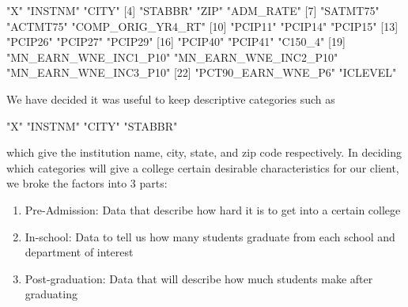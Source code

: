 \documentclass{article}
\begin{document}
\begin{Schunk}
\begin{Soutput}
 [1] "X"                    "INSTNM"               "CITY"                
 [4] "STABBR"               "ZIP"                  "ADM_RATE"            
 [7] "SATMT75"              "ACTMT75"              "COMP_ORIG_YR4_RT"    
[10] "PCIP11"               "PCIP14"               "PCIP15"              
[13] "PCIP26"               "PCIP27"               "PCIP29"              
[16] "PCIP40"               "PCIP41"               "C150_4"              
[19] "MN_EARN_WNE_INC1_P10" "MN_EARN_WNE_INC2_P10" "MN_EARN_WNE_INC3_P10"
[22] "PCT90_EARN_WNE_P6"    "ICLEVEL"             
\end{Soutput}
\end{Schunk}
We have decided it was useful to keep descriptive categories such as 
\begin{Schunk}
\begin{Soutput}
[1] "X"      "INSTNM" "CITY"   "STABBR"
\end{Soutput}
\end{Schunk}

which give the institution name, city, state, and zip code respectively.  In deciding which categories will give a college certain desirable characteristics for our client, we broke the factors into 3 parts:

\begin{enumerate}
\item Pre-Admission: Data that describe how hard it is to get into a certain college
\item In-school: Data to tell us how many students graduate from each school and department of interest
\item Post-graduation: Data that will describe how much students make after graduating
\end{enumerate}
\end{document}
